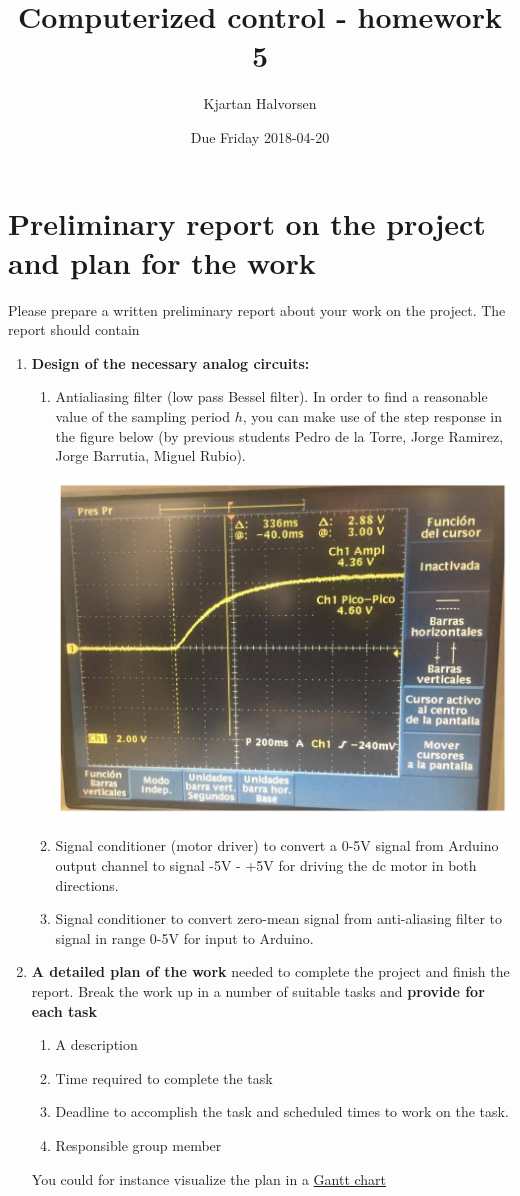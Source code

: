 \documentclass[a4paper]{scrartcl}
\author{Kjartan Halvorsen}
\date{Due Friday 2018-04-20}
\title{Computerized control - homework 5}
\begin{document}
\maketitle

\section*{Preliminary report on the project and plan for the work}
\label{sec-1}

Please prepare a written preliminary report about your work on the project. The report should contain
\begin{enumerate}
\item \textbf{Design of the necessary analog circuits:}
\begin{enumerate}
\item Antialiasing filter (low pass Bessel filter). In order to find a reasonable value of the sampling period \(h\), you can make use of the step response in the figure below (by previous students Pedro de la Torre, Jorge Ramirez, Jorge Barrutia, Miguel Rubio). 
\begin{center}
\includegraphics[width=0.8\linewidth]{../figures/step-response-oscilloscope.png}
\end{center}
\item Signal conditioner (motor driver) to convert a 0-5V signal from Arduino output channel to signal -5V - +5V for driving the dc motor in both directions.
\item Signal conditioner to convert zero-mean signal from anti-aliasing filter to signal in range 0-5V for input to Arduino.
\end{enumerate}
\item \textbf{A detailed plan of the work} needed to complete the project and finish the report. Break the work up in a number of suitable tasks and \textbf{provide for each task}
\begin{enumerate}
\item A description
\item Time required to complete the task
\item Deadline to accomplish the task and scheduled times to work on the task.
\item Responsible group member
\end{enumerate}
You could for instance visualize the plan in a \href{https://es.wikipedia.org/wiki/Diagrama_de_Gantt}{Gantt chart}
\end{enumerate}
\end{document}
